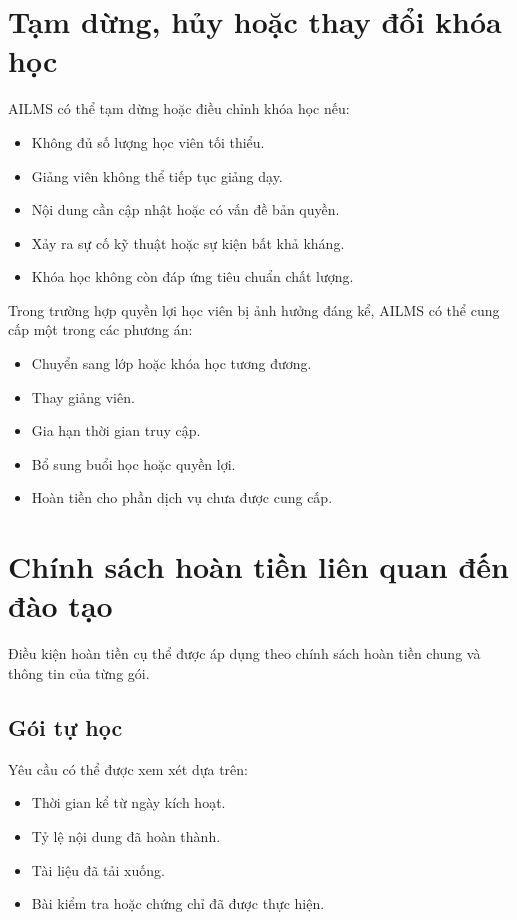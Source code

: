 \documentclass[12pt,a4paper]{article}
\begin{document}
\section{Tạm dừng, hủy hoặc thay đổi khóa học}

AILMS có thể tạm dừng hoặc điều chỉnh khóa học nếu:

\begin{itemize}
    \item Không đủ số lượng học viên tối thiểu.
    \item Giảng viên không thể tiếp tục giảng dạy.
    \item Nội dung cần cập nhật hoặc có vấn đề bản quyền.
    \item Xảy ra sự cố kỹ thuật hoặc sự kiện bất khả kháng.
    \item Khóa học không còn đáp ứng tiêu chuẩn chất lượng.
\end{itemize}

Trong trường hợp quyền lợi học viên bị ảnh hưởng đáng kể,
AILMS có thể cung cấp một trong các phương án:

\begin{itemize}
    \item Chuyển sang lớp hoặc khóa học tương đương.
    \item Thay giảng viên.
    \item Gia hạn thời gian truy cập.
    \item Bổ sung buổi học hoặc quyền lợi.
    \item Hoàn tiền cho phần dịch vụ chưa được cung cấp.
\end{itemize}

\section{Chính sách hoàn tiền liên quan đến đào tạo}

Điều kiện hoàn tiền cụ thể được áp dụng theo chính sách hoàn tiền chung
và thông tin của từng gói.

\subsection{Gói tự học}

Yêu cầu có thể được xem xét dựa trên:

\begin{itemize}
    \item Thời gian kể từ ngày kích hoạt.
    \item Tỷ lệ nội dung đã hoàn thành.
    \item Tài liệu đã tải xuống.
    \item Bài kiểm tra hoặc chứng chỉ đã được thực hiện.
\end{itemize}
\end{document}
